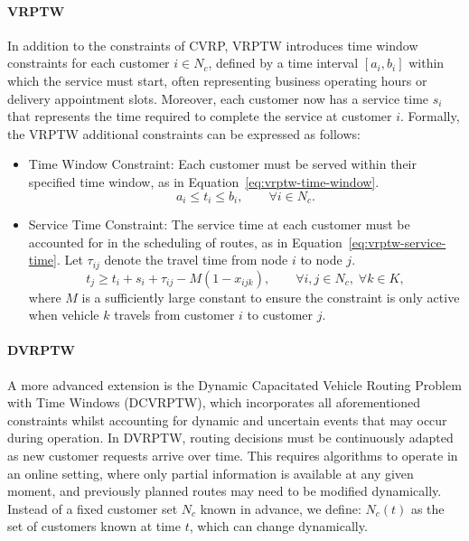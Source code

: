 \paragraph{VRPTW}
In addition to the constraints of CVRP, VRPTW introduces time window constraints
for each customer $i\in N_c$, defined by a time interval $[a_i, b_i]$ within
which the service must start, often representing business operating hours or
delivery appointment slots. Moreover, each customer now has a service time $s_i$
that represents the time required to complete the service at customer $i$.
Formally, the VRPTW additional constraints can be expressed as follows:
\begin{itemize}
	\item Time Window Constraint: Each customer must be served within their specified time window, as in Equation~\eqref{eq:vrptw-time-window}.
	\begin{equation}
	\label{eq:vrptw-time-window}
a_i \leq t_i \leq b_i,
	\qquad \forall i\in N_c.
	\end{equation}
	\item Service Time Constraint: The service time at each customer must be accounted for in the scheduling of routes, as in Equation~\eqref{eq:vrptw-service-time}.
Let $\tau_{ij}$ denote the travel time from node $i$ to node $j$.
	\begin{equation}
	\label{eq:vrptw-service-time}
t_j \geq t_i + s_i + \tau_{ij} - M(1 - x_{ijk}),
\qquad \forall i,j\in N_c,\; \forall k\in K,
	\end{equation}
where $M$ is a sufficiently large constant to ensure the constraint is only
active when vehicle $k$ travels from customer $i$ to customer $j$.

\end{itemize}

\paragraph{DVRPTW}
A more advanced extension is the Dynamic Capacitated Vehicle Routing Problem
with Time Windows (DCVRPTW), which incorporates all aforementioned constraints
whilst accounting for dynamic and uncertain events that may occur during
operation. In DVRPTW, routing decisions must be continuously adapted as new
customer requests arrive over time. This requires algorithms to operate in an
online setting, where only partial information is available at any given moment,
and previously planned routes may need to be modified dynamically. Instead of a
fixed customer set $N_c$ known in advance, we define: $N_c(t)$ as the set of
customers known at time $t$, which can change dynamically.
